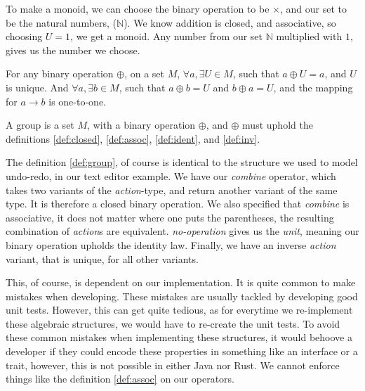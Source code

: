\begin{exmp}
  To make a monoid, we can choose the binary operation to be $\times$, and our
  set to be the natural numbers, ($\mathbb{N}$). We know addition is closed, and
  associative, so choosing $U = 1$, we get a monoid. Any number from our set
  $\mathbb{N}$ multiplied with $1$, gives us the number we choose.
\end{exmp}

\begin{definition} \label{def:inv}
  For any binary operation $\oplus$, on a set $M$,
  $\forall a, \exists U \in M$, such that
  $a \oplus U = a$, and $U$ is unique.
  And $\forall a, \exists b \in M$, such that $a \oplus b = U$ and
  $b \oplus a = U$, and the mapping for $a \to b$ is one-to-one.
\end{definition}

\begin{definition}[Group] \label{def:group}
  A group is a set $M$, with a binary operation $\oplus$, and $\oplus$ must
  uphold the definitions \ref{def:closed}, \ref{def:assoc}, \ref{def:ident},
  and \ref{def:inv}.
\end{definition}

The definition \ref{def:group}, of course is identical to the structure we used
to model undo-redo, in our text editor example. We have our \textit{combine}
operator, which takes two variants of the \textit{action}-type, and return
another variant of the same type. It is therefore a closed binary operation. We
also specified that \textit{combine} is associative, it does not matter where one
puts the parentheses, the resulting combination of \textit{action}s are
equivalent. \textit{no-operation} gives us the \textit{unit}, meaning our binary
operation upholds the identity law. Finally, we have an inverse \textit{action}
variant, that is unique, for all other variants.

This, of course, is dependent on our implementation. It is quite common to make
mistakes when developing. These mistakes are usually tackled by developing good
unit tests. However, this can get quite tedious, as for everytime we re-implement
these algebraic structures, we would have to re-create the unit tests. To avoid
these common mistakes when implementing these structures, it would behoove a
developer if they could encode these properties in something like an interface or
a trait, however, this is not possible in either Java nor Rust. We cannot enforce
things like the definition \ref{def:assoc} on our operators.

